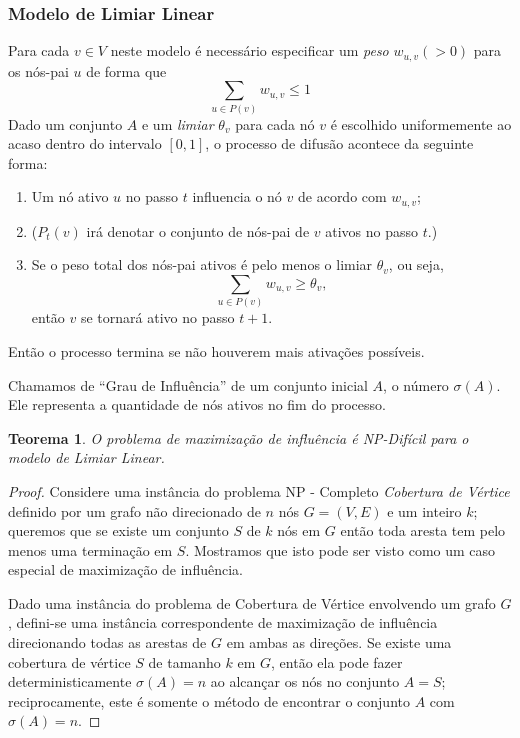 \documentclass{acm_proc_article-sp}
\newtheorem{thm}{Teorema}
\begin{document}
  \subsubsection{Modelo de Limiar Linear}\label{ltm}
Para cada $v \in V$ neste modelo é necessário especificar um \textit{peso} $w_{u,v} (> 0)$ para os nós-pai $u$ de forma que 
\begin{equation} \label{1}
\sum_{u\in P(v)} w_{u,v} \leq 1 
\end{equation}
Dado um conjunto $A$ e um \textit{limiar} $\theta_{v}$ para cada nó $v$ é escolhido uniformemente ao acaso dentro do intervalo $[0,1]$,
o processo de difusão acontece da seguinte forma:
\begin{enumerate}
  \item Um nó ativo $u$ no passo $t$ influencia o nó $v$ de acordo com $w_{u,v}$;
  \item ($P_{t}(v)$ irá denotar o conjunto de nós-pai de $v$ ativos no passo $t$.)
  \item Se o peso total dos nós-pai ativos é pelo menos o limiar $\theta_{v}$, ou seja, $$\sum_{u\in P(v)} w_{u,v}
  \geq \theta_{v},$$ então $v$ se tornará ativo no passo $t+1$.
\end{enumerate}
Então o processo termina se não houverem mais ativações possíveis.

Chamamos de ``Grau de Influência'' de um conjunto inicial $A$, o número $\sigma(A)$. Ele representa a quantidade de nós 
ativos no fim do processo.

\begin{thm}
O problema de maximização de influência é NP-Difícil para o modelo de Limiar Linear.
\end{thm}

\begin{proof}
Considere uma instância do problema NP - Completo \textit{Cobertura de Vértice} definido por um grafo não
direcionado de $n$ nós $G = (V,E)$ e um inteiro $k$; queremos que se existe um conjunto $S$ de $k$ nós em $G$ então
toda aresta tem pelo menos uma terminação em $S$. Mostramos que isto pode ser visto como um caso especial de
maximização de influência.

Dado uma instância do problema de Cobertura de Vértice envolvendo um grafo $G$, defini-se uma instância
correspondente de maximização de influência direcionando todas as arestas de $G$ em ambas as direções. Se existe uma
cobertura de vértice $S$ de tamanho $k$ em $G$, então ela pode fazer deterministicamente $\sigma(A) = n$ ao
alcançar os nós no conjunto $A = S$; reciprocamente, este é somente o método de encontrar o conjunto $A$ com
$\sigma(A) = n$.
\end{proof}
\end{document}
